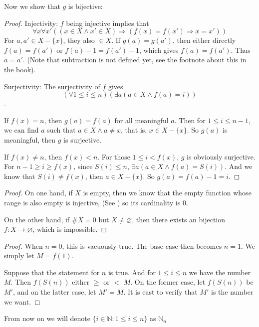 Now we show that $g$ is bijective:
\begin{proof}
Injectivity: $f$ being injective implies that 
\[
\forall x \forall x'((x \in X \wedge x' \in X) \Longrightarrow (f(x) = f(x') \Rightarrow x = x'))
\]
For $a,a' \in X - \{x\}$, they also $\in X$. If $g(a) = g(a')$, then either directly $f(a) = f(a')$ or 
$f(a) - 1 = f(a') - 1$, which gives $f(a) = f(a')$. Thus $a = a'$. (Note that subtraction is not defined 
yet, see the footnote about this in the book).

Surjectivity: The surjectivity of $f$ gives 
\[
(\forall 1 \leq i \leq n)(\exists a(a \in X \wedge f(a) = i))
\].

If $f(x) = n$, then $g(a) = f(a)$ for all meaningful $a$. Then for $1 \leq i \leq n-1$, we can find $a$ 
such that $a \in X \wedge a \neq x$, that is, $x \in X - \{x\}$. So $g(a)$ is meaningful, then $g$ is 
surjective.

If $f(x) \neq n$, then $f(x) < n$. For those $1 \leq i < f(x)$, $g$ is obviously surjective. For 
$n-1 \geq i \geq f(x)$, since $S(i) \leq n$, $\exists a(a \in X \wedge f(a) = S(i))$. And we know that 
$S(i) \neq f(x)$, then $a \in X - \{x\}$. So $g(a) = f(a) - 1 = i$.
\end{proof}

\begin{proof}
On one hand, if $X$ is empty, then we know that the empty function whose range is also empty is injective, 
(See ) so its cardinality is $0$. 

On the other hand, if $\# X = 0$ but $X \neq \varnothing$, then there exists an bijection 
$f:X \rightarrow \varnothing$, which is impossible.
\end{proof}

\begin{proof}
When $n = 0$, this is vacuously true. The base case then becomes $n=1$. We simply let $M = f(1)$.

Suppose that the statement for $n$ is true. And for $1\leq i\leq n$ we have the number $M$. Then $f(S(n))$ 
either $\geq$ or $<$ $M$. On the former case, let $f(S(n))$ be $M'$, and on the latter case, let $M' = M$. 
It is east to verify that $M'$ is the number we want.
\end{proof}

From now on we will denote $\{i\in \mathbb{N}:1\leq i \leq n\}$ as $\mathbb{N}_n$

